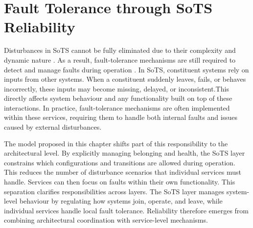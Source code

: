 \section{Fault Tolerance through SoTS Reliability}
\label{sec:reducing-fault-tolerance-burden}
Disturbances in SoTS cannot be fully eliminated due to their complexity and dynamic nature \cite{nielsen2015systems,ferreira2023towards}. As a result, fault-tolerance mechanisms are still required to detect and manage faults during operation \cite{hanmer2013patterns,avizienis2004basic}. In SoTS, constituent systems rely on inputs from other systems. When a constituent suddenly leaves, fails, or behaves incorrectly, these inputs may become missing, delayed, or inconsistent.This directly affects system behaviour and any functionality built on top of these interactions. In practice, fault-tolerance mechanisms are often implemented within these services, requiring them to handle both internal faults and issues caused by external disturbances.

The model proposed in this chapter shifts part of this responsibility to the architectural level. By explicitly managing belonging and health, the SoTS layer constrains which configurations and transitions are allowed during operation. This reduces the number of disturbance scenarios that individual services must handle. Services can then focus on faults within their own functionality. This separation clarifies responsibilities across layers. The SoTS layer manages system-level behaviour by regulating how systems join, operate, and leave, while individual services handle local fault tolerance. Reliability therefore emerges from combining architectural coordination with service-level mechanisms.